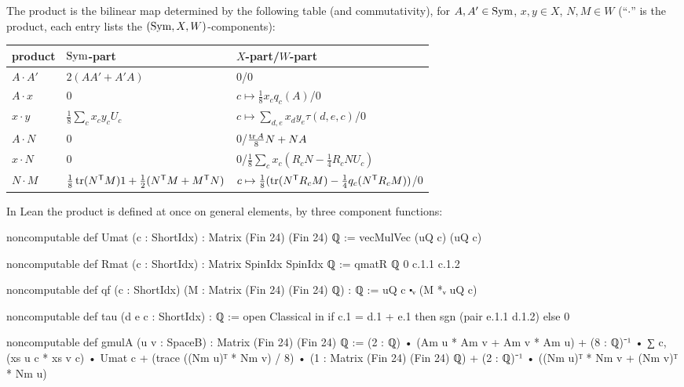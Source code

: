 \begin{definition}\label{ch21:def:gmul}
The product is the bilinear map determined by the following table (and commutativity), for
$A,A'\in\mathrm{Sym}$, $x,y\in X$, $N,M\in W$ (``$\cdot$'' is the product, each entry lists the
$(\mathrm{Sym},X,W)$-components):

\begin{center}\small
\begin{tabular}{lll}
\toprule
product & $\mathrm{Sym}$-part & $X$-part\quad/\quad $W$-part\\\midrule
$A\cdot A'$ & $2(AA'+A'A)$ & $0$\quad/\quad$0$\\
$A\cdot x$ & $0$ & $c\mapsto\tfrac18x_cq_c(A)$\quad/\quad$0$\\
$x\cdot y$ & $\tfrac18\sum_cx_cy_cU_c$ & $c\mapsto\sum_{d,e}x_dy_e\tau(d,e,c)$\quad/\quad$0$\\
$A\cdot N$ & $0$ & $0$\quad/\quad$\tfrac{\operatorname{tr} A}8N+NA$\\
$x\cdot N$ & $0$ & $0$\quad/\quad$\tfrac18\sum_cx_c(R_cN-\tfrac14R_cNU_c)$\\
$N\cdot M$ & $\tfrac18\operatorname{tr}(N^{\mathsf T}M)1+\tfrac12(N^{\mathsf T}M+M^{\mathsf T}N)$ &
  $c\mapsto\tfrac18(\operatorname{tr}(N^{\mathsf T}R_cM)-\tfrac14q_c(N^{\mathsf T}R_cM))$\quad/\quad$0$\\
\bottomrule
\end{tabular}
\end{center}
\end{definition}
In Lean the product is defined at once on general elements, by three component functions:
\begin{leancode}
noncomputable def Umat (c : ShortIdx) : Matrix (Fin 24) (Fin 24) ℚ := vecMulVec (uQ c) (uQ c)

noncomputable def Rmat (c : ShortIdx) : Matrix SpinIdx SpinIdx ℚ := qmatR ℚ 0 c.1.1 c.1.2

noncomputable def qf (c : ShortIdx) (M : Matrix (Fin 24) (Fin 24) ℚ) : ℚ :=
  uQ c ⬝ᵥ (M *ᵥ uQ c)

noncomputable def tau (d e c : ShortIdx) : ℚ :=
  open Classical in if c.1 = d.1 + e.1 then sgn (pair e.1.1 d.1.2) else 0
\end{leancode}
\begin{leancode}
noncomputable def gmulA (u v : SpaceB) : Matrix (Fin 24) (Fin 24) ℚ :=
  (2 : ℚ) • (Am u * Am v + Am v * Am u) + (8 : ℚ)⁻¹ • ∑ c, (xs u c * xs v c) • Umat c +
    (trace ((Nm u)ᵀ * Nm v) / 8) • (1 : Matrix (Fin 24) (Fin 24) ℚ) +
    (2 : ℚ)⁻¹ • ((Nm u)ᵀ * Nm v + (Nm v)ᵀ * Nm u)
\end{leancode}
